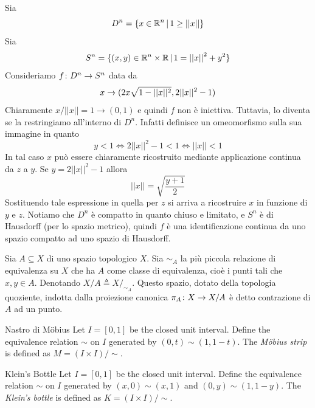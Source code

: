\documentclass[a4paper]{article}
\begin{document}
\begin{snippetexample}{}
    Sia \[D^n = \{x \in \mathbb{R}^n \,|\, 1 \geq ||x||\}\]
    Sia \[
        S^n = \{(x,y) \in \mathbb{R}^{n} \times \mathbb{R} \,|\, 1 = {||x||}^2 + y^2\}
    \]
    Consideriamo \(f \colon D^n \to S^n\)
    data da
    \[
        x \to (2x\sqrt{1-||x||^2}, 2||x||^2 - 1)
    \]
    Chiaramente \(x / ||x|| = 1 \to (0,1)\)
    e quindi \(f\) non è iniettiva. Tuttavia, lo diventa
    se la restringiamo all'interno di \(D^n\).
    Infatti definisce un omeomorfismo sulla sua immagine in quanto
    \[
        y < 1 \iff 2||x||^2 - 1 < 1 \iff ||x|| < 1
    \]
    In tal caso \(x\) può essere chiaramente ricostruito mediante applicazione
    continua da \(z\) a \(y\).
    Se \(y = 2||x||^2 - 1\)
    allora 
    \[
        ||x|| = \sqrt{\frac{y + 1}{2}}
    \]
    Sostituendo tale espressione in quella per \(z\)
    si arriva a ricostruire \(x\) in funzione di \(y\) e \(z\).
    Notiamo che
    \(D^n\) è compatto in quanto chiuso e limitato, e \(S^n\) è di Hausdorff
    (per lo spazio metrico), quindi \(f\) è una identificazione continua da uno
    spazio compatto ad uno spazio di Hausdorff.
\end{snippetexample}

\begin{snippetdefinition}{}
    Sia \(A \subseteq X\) di uno spazio topologico \(X\).
    Sia \(\sim_A\) la più piccola relazione di equivalenza
    su \(X\) che ha \(A\) come classe di equivalenza, cioè i punti tali che \(x,y \in A\).
    Denotando \(X / A \triangleq X /_{\sim_A}\).
    Questo spazio, dotato della topologia quoziente,
    indotta dalla proiezione canonica \(\pi_A \colon X \to X/A\)
    è detto contrazione di \(A\) ad un punto.
\end{snippetdefinition}

\begin{radioactive}
\begin{snippetdefinition}{Nastro di Möbius}
    Let \(I = [0,1]\) be the closed unit interval.
    Define the equivalence relation \(\sim\) on \(I\) generated
    by \((0,t) \sim (1,1-t)\).
    The \emph{Möbius strip} is defined as \(M = (I \times I)/\sim\).
\end{snippetdefinition}

\begin{snippetdefinition}{Klein's Bottle}
    Let \(I = [0,1]\) be the closed unit interval.
    Define the equivalence relation \(\sim\) on \(I\) generated
    by \((x,0) \sim (x,1)\) and \((0,y) \sim (1,1-y)\).
    The \emph{Klein's bottle} is defined as \(K = (I \times I)/\sim\).
\end{snippetdefinition}
\end{radioactive}
\end{document}
